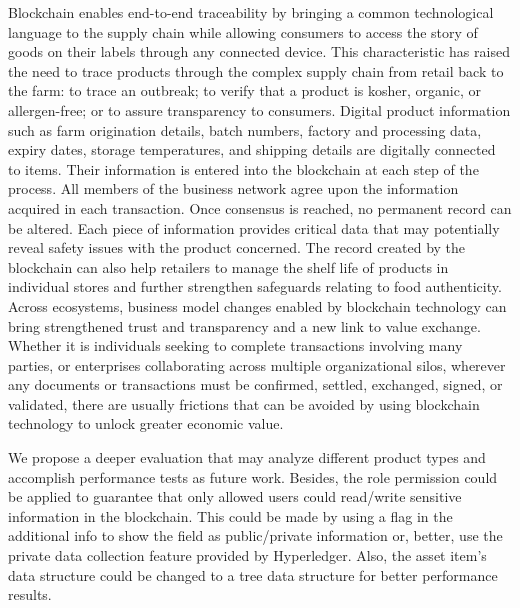 Blockchain enables end-to-end traceability by bringing a common technological language to the supply chain while allowing consumers to access the story of goods on their labels through any connected device. This characteristic has raised the need to trace products through the complex supply chain from retail back to the farm: to trace an outbreak; to verify that a product is kosher, organic, or allergen-free; or to assure transparency to consumers. Digital product information such as farm origination details, batch numbers, factory and processing data, expiry dates, storage temperatures, and shipping details are digitally connected to items. Their information is entered into the blockchain at each step of the process. All members of the business network agree upon the information acquired in each transaction. Once consensus is reached, no permanent record can be altered. Each piece of information provides critical data that may potentially reveal safety issues with the product concerned. The record created by the blockchain can also help retailers to manage the shelf life of products in individual stores and further strengthen safeguards relating to food authenticity. Across ecosystems, business model changes enabled by blockchain technology can bring strengthened trust and transparency and a new link to value exchange. Whether it is individuals seeking to complete transactions involving many parties, or enterprises collaborating across multiple organizational silos, wherever any documents or transactions must be confirmed, settled, exchanged, signed, or validated, there are usually frictions that can be avoided by using blockchain technology to unlock greater economic value.

We propose a deeper evaluation that may analyze different product types and accomplish performance tests as future work. Besides, the role permission could be applied to guarantee that only allowed users could read/write sensitive information in the blockchain. This could be made by using a flag in the additional info to show the field as public/private information or, better, use the private data collection feature provided by Hyperledger. Also, the asset item's data structure could be changed to a tree data structure for better performance results. 